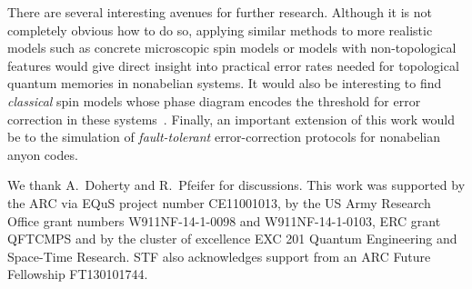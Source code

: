 \documentclass[aps, prl, letterpaper, twocolumn, superscriptaddress, notitlepage, 10pt]{revtex4}
\begin{document}
There are several interesting avenues for further research. 
Although it is not completely obvious how to do so, 
applying similar methods to more realistic models such as concrete 
microscopic spin models or models with non-topological features would give 
direct insight into practical error rates needed for topological quantum memories in nonabelian systems. 
It would also be interesting to find \emph{classical} spin models 
whose phase diagram encodes the threshold for error correction in these systems~\cite{Dennis2002}.
Finally, an important extension of this work would be to the simulation of \emph{fault-tolerant} error-correction protocols for nonabelian anyon codes. 


\acknowledgments 

We thank A.\ Doherty and R.\ Pfeifer for discussions. 
This work was supported by the ARC via EQuS project number CE11001013, by the US Army Research Office grant numbers W911NF-14-1-0098 and W911NF-14-1-0103, ERC grant QFTCMPS and by the cluster of excellence EXC 201 Quantum Engineering and Space-Time Research. STF also acknowledges support from an ARC Future Fellowship FT130101744.


\end{document}
